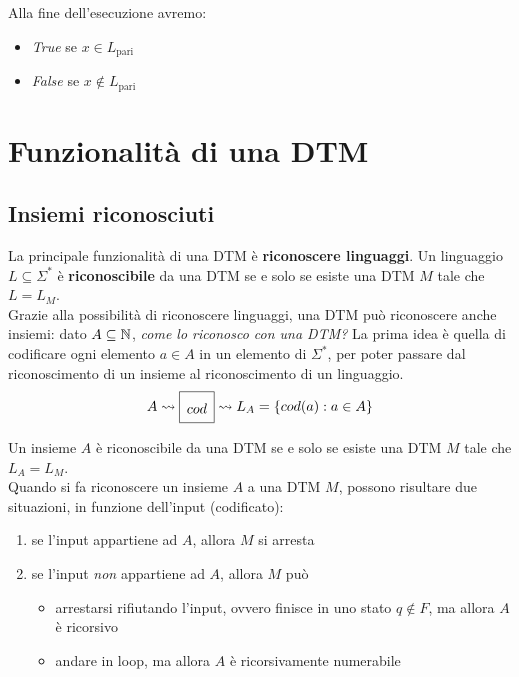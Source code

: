 Alla fine dell'esecuzione avremo: 
\begin{itemize}
	\item \textit{True} se $x \in L_{\text{pari}}$
	\item \textit{False} se $x \notin L_{\text{pari}}$
\end{itemize}

\section{Funzionalità di una DTM}

\subsection{Insiemi riconosciuti}

La principale funzionalità di una DTM è \textbf{riconoscere linguaggi}. Un linguaggio $L \subseteq \Sigma^\ast$ è \textbf{riconoscibile} da una DTM se e solo se esiste una DTM $M$ tale che $L = L_M$.\\

Grazie alla possibilità di riconoscere linguaggi, una DTM può riconoscere anche insiemi: dato $A \subseteq \mathbb{N}$, \textit{come lo riconosco con una DTM?} La prima idea è quella di codificare ogni elemento $a \in A$ in un elemento di $\Sigma^\ast$, per poter passare dal riconoscimento di un insieme al riconoscimento di un linguaggio.
$$
\renewcommand{\arraystretch}{1.8}
A \rightsquigarrow \begin{array}{|c|}
	\hline
	cod \\
	\hline
\end{array}
\rightsquigarrow L_A = \{cod(a): a \in A\}
$$

Un insieme $A$ è riconoscibile da una DTM se e solo se esiste una DTM $M$ tale che $L_A = L_M$.\\

Quando si fa riconoscere un insieme $A$ a una DTM $M$, possono risultare due situazioni, in funzione dell'input (codificato):
\begin{enumerate}
	\item se l'input appartiene ad $A$, allora $M$ si arresta
	\item se l'input \textit{non} appartiene ad $A$, allora $M$ può 
	\begin{itemize}
		\item arrestarsi rifiutando l'input, ovvero finisce in uno stato $q \notin F$, ma allora $A$ è ricorsivo
		\item andare in loop, ma allora $A$ è ricorsivamente numerabile
	\end{itemize}
\end{enumerate}

